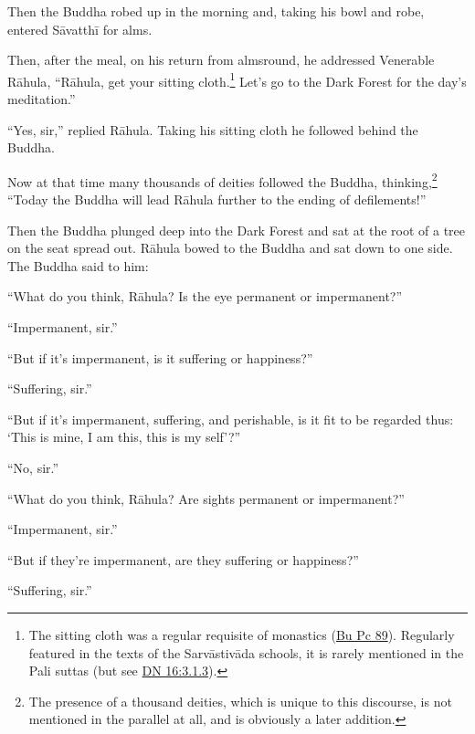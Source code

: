 \documentclass[12pt,openany]{book}%
\begin{document}
Then the Buddha robed up in the morning and, taking his bowl and robe, entered \textsanskrit{Sāvatthī} for alms. 

Then, after the meal, on his return from almsround, he addressed Venerable \textsanskrit{Rāhula}, “\textsanskrit{Rāhula}, get your sitting cloth.\footnote{The sitting cloth was a regular requisite of monastics (\href{https://suttacentral.net/pli-tv-bu-vb-pc89/en/sujato}{Bu Pc 89}). Regularly featured in the texts of the \textsanskrit{Sarvāstivāda} schools, it is rarely mentioned in the Pali suttas (but see \href{https://suttacentral.net/dn16/en/sujato\#3.1.3}{DN 16:3.1.3}). } Let’s go to the Dark Forest for the day’s meditation.” 

“Yes, sir,” replied \textsanskrit{Rāhula}. Taking his sitting cloth he followed behind the Buddha. 

Now at that time many thousands of deities followed the Buddha, thinking,\footnote{The presence of a thousand deities, which is unique to this discourse, is not mentioned in the parallel at all, and is obviously a later addition. } “Today the Buddha will lead \textsanskrit{Rāhula} further to the ending of defilements!” 

Then the Buddha plunged deep into the Dark Forest and sat at the root of a tree on the seat spread out. \textsanskrit{Rāhula} bowed to the Buddha and sat down to one side. The Buddha said to him: 

“What do you think, \textsanskrit{Rāhula}? Is the eye permanent or impermanent?” 

“Impermanent, sir.” 

“But if it’s impermanent, is it suffering or happiness?” 

“Suffering, sir.” 

“But if it’s impermanent, suffering, and perishable, is it fit to be regarded thus: ‘This is mine, I am this, this is my self’?” 

“No, sir.” 

“What do you think, \textsanskrit{Rāhula}? Are sights permanent or impermanent?” 

“Impermanent, sir.” 

“But if they're impermanent, are they suffering or happiness?” 

“Suffering, sir.” 
\end{document}
